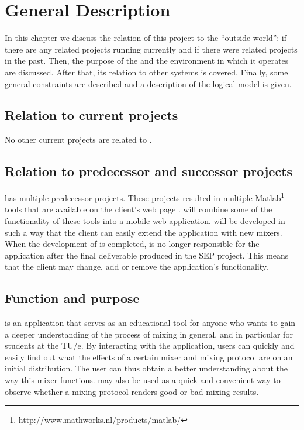 \chapter{General Description}
\label{chap:gendesc}
In this chapter we discuss the relation of this project to the ``outside world'': if there are any related projects running currently and if there were related projects in the past. Then, the purpose of the \applicationname{} and the environment in which it operates are discussed. After that, its relation to other systems is covered. Finally, some general constraints are described and a description of the logical model is given.

\section{Relation to current projects}
\label{sec:curproj}
No other current projects are related to \projectname{}.

\section{Relation to predecessor and successor projects}
\label{sec:predsuc}
\projectname{} has multiple predecessor projects. These projects resulted in multiple Matlab\footnote{\url{http://www.mathworks.nl/products/matlab/}} tools that are available on the client's web page \cite{clientpage}. \projectname{} will combine some of the functionality of these tools into a mobile web application. \projectname{} will be developed in such a way that the client can easily extend the application with new mixers. When the development of \projectname{} is completed, \projectname{} is no longer responsible for the application after the final deliverable produced in the SEP project. This means that the client may change, add or remove the application's functionality.

\section{Function and purpose}
\label{sec:functpurp}
\projectname{} is an application that serves as an educational tool for anyone who wants to gain a deeper understanding of the process of mixing in general, and in particular for students at the TU/e. By interacting with the application, users can quickly and easily find out what the effects of a certain mixer and mixing protocol are on an initial distribution. The user can thus obtain a better understanding about the way this mixer functions. \projectname{} may also be used as a quick and convenient way to observe whether a mixing protocol renders good or bad mixing results.

